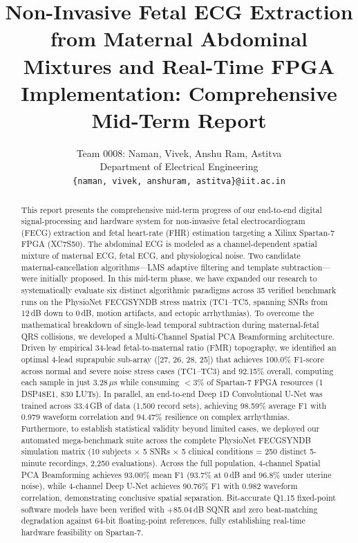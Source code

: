 \documentclass[10pt,twocolumn,letterpaper]{article}
\newcommand{\newcontent}[1]{\textcolor{midtermblue}{#1}}
\begin{document}
\title{Non-Invasive Fetal ECG Extraction from Maternal Abdominal Mixtures and Real-Time FPGA Implementation: Comprehensive Mid-Term Report}

\author{Team 0008: Naman, Vivek, Anshu Ram, Astitva\\
Department of Electrical Engineering\\
{\tt\small \{naman, vivek, anshuram, astitva\}@iit.ac.in}
}
\maketitle

\begin{abstract}
This report presents the comprehensive mid-term progress of our end-to-end digital signal-processing and hardware system for non-invasive fetal electrocardiogram (FECG) extraction and fetal heart-rate (FHR) estimation targeting a Xilinx Spartan-7 FPGA (XC7S50). The abdominal ECG is modeled as a channel-dependent spatial mixture of maternal ECG, fetal ECG, and physiological noise. Two candidate maternal-cancellation algorithms---LMS adaptive filtering and template subtraction---were initially proposed. \newcontent{In this mid-term phase, we have expanded our research to systematically evaluate six distinct algorithmic paradigms across 35 verified benchmark runs on the PhysioNet FECGSYNDB stress matrix (TC1--TC5, spanning SNRs from 12\,dB down to 0\,dB, motion artifacts, and ectopic arrhythmias). To overcome the mathematical breakdown of single-lead temporal subtraction during maternal-fetal QRS collisions, we developed a Multi-Channel Spatial PCA Beamforming architecture. Driven by empirical 34-lead fetal-to-maternal ratio (FMR) topography, we identified an optimal 4-lead suprapubic sub-array ([27, 26, 28, 25]) that achieves 100.0\% F1-score across normal and severe noise stress cases (TC1--TC3) and 92.15\% overall, computing each sample in just 3.28\,$\mu$s while consuming $<3\%$ of Spartan-7 FPGA resources (1 DSP48E1, 830 LUTs). In parallel, an end-to-end Deep 1D Convolutional U-Net was trained across 33.4\,GB of data (1,500 record sets), achieving 98.59\% average F1 with 0.979 waveform correlation and 94.47\% resilience on complex arrhythmias. Furthermore, to establish statistical validity beyond limited cases, we deployed our automated mega-benchmark suite across the complete PhysioNet FECGSYNDB simulation matrix (10 subjects $\times$ 5 SNRs $\times$ 5 clinical conditions = 250 distinct 5-minute recordings, 2,250 evaluations). Across the full population, 4-channel Spatial PCA Beamforming achieves 93.00\% mean F1 (93.7\% at 0\,dB and 96.8\% under uterine noise), while 4-channel Deep U-Net achieves 90.76\% F1 with 0.982 waveform correlation, demonstrating conclusive spatial separation. Bit-accurate Q1.15 fixed-point software models have been verified with +85.04\,dB SQNR and zero beat-matching degradation against 64-bit floating-point references, fully establishing real-time hardware feasibility on Spartan-7.}
\end{abstract}
\end{document}
